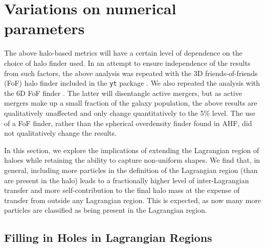 \section{Variations on numerical parameters}
\label{sec:convergence}

The above halo-based metrics will have a certain level of dependence on the
choice of halo finder used. In an attempt to ensure independence of the
results from such factors, the above analysis was repeated  with the 3D
friends-of-friends (FoF) halo finder included in the {\tt yt} package
\citep{Turk2011}. We also repeated the analysis with the \velociraptor{} 6D
FoF finder \citep{Elahi2019}. The latter will disentangle active mergers, but
as active mergers make up a small fraction of the galaxy population, the
above results are qualitatively unaffected and only change quantitatively
to the 5\% level. The use of a FoF finder, rather than the spherical
overdensity finder found in AHF, did not qualitatively change the results.


In this section, we explore the implications of extending the Lagrangian
region of haloes while retaining the ability to capture non-uniform shapes. We
find that, in general, including more particles in the definition of the Lagrangian
region (than are present in the halo) leads to a fractionally higher level
of inter-Lagrangian transfer and more self-contribution to the final halo mass
at the expense of transfer from outside any Lagrangian region. This is expected, as
now many more particles are classified as being present in the Lagrangian region.


\subsection{Filling in Holes in Lagrangian Regions}


